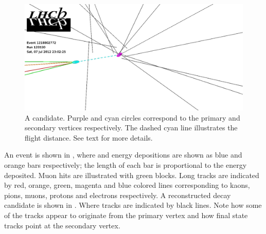 \begin{figure}[t]
  \centering
 \includegraphics[width=\textwidth,trim=0cm 3cm 17cm 0cm, clip=true]{Figures/Chapter2/jpsikst_event}
  \caption{A \BsJpsiKst candidate. Purple and cyan circles correspond to the primary and secondary
           vertices respectively. The dashed cyan line illustrates the \Bs flight distance.
          See text for more details.}
  \label{det_jpsikst_cand}
\end{figure}

An \lhcb event is shown in , where \ecal and \hcal energy depositions are
shown as blue and orange bars respectively; the length of each bar is proportional to the energy
deposited. Muon hits are illustrated with green blocks. Long tracks are indicated by red, orange,
green, magenta and blue colored lines corresponding to kaons, pions, muons, protons and electrons
respectively. A reconstructed \BsJpsiKst decay candidate is shown in .
Where \velo tracks are indicated by black lines. Note how some of the \velo tracks appear
to originate from the primary vertex and how \Bs final state tracks point at the secondary vertex.

